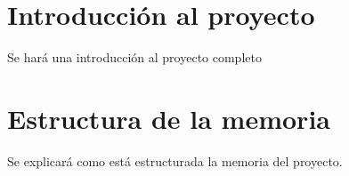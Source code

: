 
\section{Introducción al proyecto}
Se hará una introducción al proyecto completo

\section{Estructura de la memoria}
Se explicará como está estructurada la memoria del proyecto.
